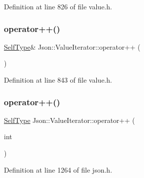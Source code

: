 Definition at line 826 of file value.\+h.

\hypertarget{class_json_1_1_value_iterator_a92146c46f8249e2b2d12869e70cd4cee}{}\label{class_json_1_1_value_iterator_a92146c46f8249e2b2d12869e70cd4cee} 
\subsubsection{\texorpdfstring{operator++()}{operator++()}\hspace{0.1cm}{\footnotesize\ttfamily [2/4]}}
{\footnotesize\ttfamily \hyperlink{class_json_1_1_value_iterator_base_a9d2a940d03ea06d20d972f41a89149ee}{Self\+Type}\& Json\+::\+Value\+Iterator\+::operator++ (\begin{DoxyParamCaption}{ }\end{DoxyParamCaption})\hspace{0.3cm}{\ttfamily [inline]}}



Definition at line 843 of file value.\+h.

\hypertarget{class_json_1_1_value_iterator_abcf4ddd994a010742cd4a436d65acd08}{}\label{class_json_1_1_value_iterator_abcf4ddd994a010742cd4a436d65acd08} 
\subsubsection{\texorpdfstring{operator++()}{operator++()}\hspace{0.1cm}{\footnotesize\ttfamily [3/4]}}
{\footnotesize\ttfamily \hyperlink{class_json_1_1_value_iterator_base_a9d2a940d03ea06d20d972f41a89149ee}{Self\+Type} Json\+::\+Value\+Iterator\+::operator++ (\begin{DoxyParamCaption}\item[{int}]{ }\end{DoxyParamCaption})\hspace{0.3cm}{\ttfamily [inline]}}



Definition at line 1264 of file json.\+h.

\hypertarget{class_json_1_1_value_iterator_a92146c46f8249e2b2d12869e70cd4cee}{}\label{class_json_1_1_value_iterator_a92146c46f8249e2b2d12869e70cd4cee} 
